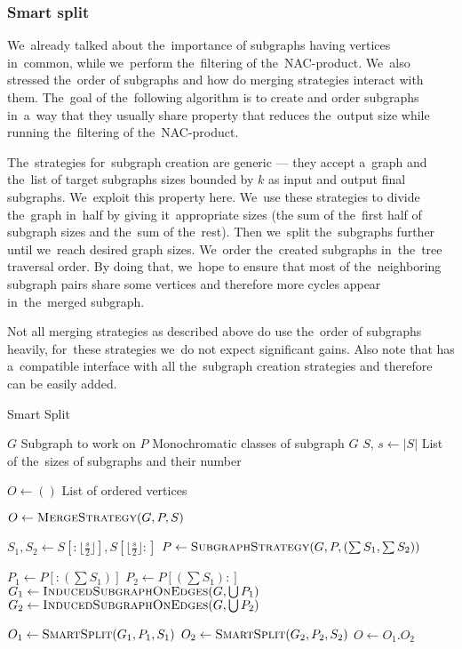 \subsubsection*{Smart split}%
\label{sec:smart_split}

We~already talked about the~importance of subgraphs having vertices in~common,
while we~perform the~filtering of the~NAC-product.
We~also stressed the~order of subgraphs and
how do merging strategies interact with them.
The~goal of the~following algorithm is to create and order subgraphs in~a~way that they usually
share property that reduces the~output size while running
the~filtering of the~NAC-product.

The~strategies for~subgraph creation are generic --- they accept a~graph and
the~list of target subgraphs sizes bounded by \( k \) as input and output final subgraphs.
We~exploit this property here.
We~use these strategies to divide the~graph in~half by giving it~appropriate
sizes (the sum of the~first half of subgraph sizes and the~sum of the~rest).
Then we~split the~subgraphs further until we~reach desired graph sizes.
We~order the~created subgraphs in~the~tree traversal order.
By doing that, we~hope to ensure that most of the~neighboring subgraph pairs share
some vertices and therefore more cycles appear in~the~merged subgraph.

Not all merging strategies as described above do use the~order of subgraphs heavily,
for~these strategies we~do not expect significant gains.
Also note that  has a~compatible interface with
all the~subgraph creation strategies and therefore can be easily added.

\begin{algorithm}
	\caption{Smart Split}%
	\label{alg:smart_split}
	\begin{algorithmic}[1]
		\Require{} $G$
		\Comment{} Subgraph to work on
		\Require{} $P$
		\Comment{} Monochromatic classes of subgraph $G$
		\Require{} $S$, $s \gets |S|$
		\Comment{} List of the~sizes of subgraphs and their number

		\Ensure{} $O \gets ()$
		\Comment{} List of ordered vertices

		\State{} $O \gets \Call{MergeStrategy}{G, P, S}$
		\State{}
		\Return{}
		\EndIf{}

		\State{} $S_1, S_2 \gets S[:\lfloor\frac{s}{2}\rfloor], S[\lfloor\frac{s}{2}\rfloor:]$
		\State{} $P \gets \Call{SubgraphStrategy}{G, P, (\sum S_{1}, \sum S_{2})}$

		\State{} $P_1 \gets P[:(\sum S_1)]$
		\State{} $P_2 \gets P[(\sum S_1):]$
		\State{} $G_1 \gets \Call{InducedSubgraphOnEdges}{G, \bigcup P_1}$
		\State{} $G_2 \gets \Call{InducedSubgraphOnEdges}{G, \bigcup P_2}$

		\State{} $O_1 \gets \Call{SmartSplit}{G_1, P_1, S_1}$
		\State{} $O_2 \gets \Call{SmartSplit}{G_2, P_2, S_2}$
		\State{} $O \gets O_{1}.O_{2}$
	\end{algorithmic}
\end{algorithm}



